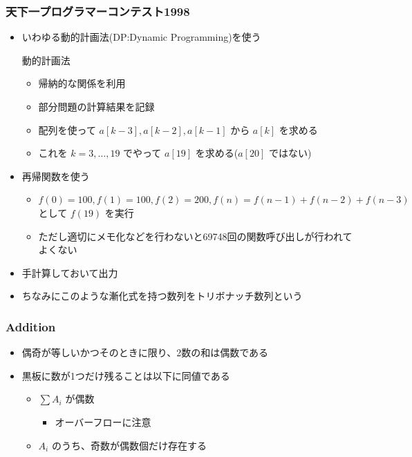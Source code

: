 \documentclass[t, aspectratio=169, dvipdfmx]{beamer}
\begin{document}
\begin{frame}
  \frametitle{天下一プログラマーコンテスト1998}
  \begin{itemize}
    \item いわゆる動的計画法(DP:Dynamic Programming)を使う
    \begin{block}{動的計画法}
      \begin{itemize}
        \item 帰納的な関係を利用
        \item 部分問題の計算結果を記録
      \end{itemize}
    \end{block}
    \begin{itemize}
      \item 配列を使って $a[k-3], a[k-2], a[k-1]$ から $a[k]$ を求める
      \item これを $k=3,\ldots,19$ でやって $a[19]$ を求める($a[20]$ ではない)
    \end{itemize}
    \item 再帰関数を使う
    \begin{itemize}
      \item $f(0)=100, f(1)=100, f(2)=200, f(n)=f(n-1)+f(n-2)+f(n-3)$ として $f(19)$ を実行
      \item ただし適切にメモ化などを行わないと69748回の関数呼び出しが行われてよくない
    \end{itemize}
    \item 手計算しておいて出力
    \item ちなみにこのような漸化式を持つ数列をトリボナッチ数列という
  \end{itemize}
\end{frame}

\begin{frame}
  \frametitle{Addition}
  \begin{itemize}
    \item 偶奇が等しいかつそのときに限り、2数の和は偶数である
    \item 黒板に数が1つだけ残ることは以下に同値である
    \begin{itemize}
      \item $\sum A_i$ が偶数
      \begin{itemize}
        \item オーバーフローに注意
      \end{itemize}
      \item $A_i$ のうち、奇数が偶数個だけ存在する
    \end{itemize}
  \end{itemize}
\end{frame}
\end{document}
